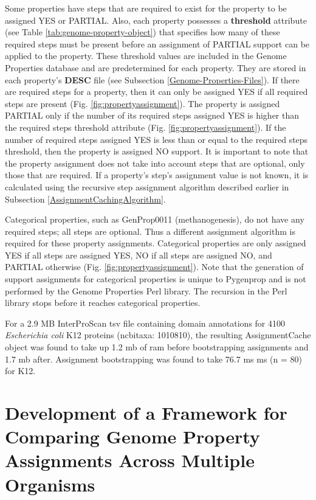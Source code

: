 Some properties have steps that are required to exist for the property to be 
assigned YES or PARTIAL. Also, each property possesses a \textbf{threshold} 
attribute (see Table \ref{tab:genome-property-object}) that specifies how many 
of these required steps must be present before an assignment of PARTIAL support 
can be applied to the property. These threshold values are included in the 
Genome Properties database and are predetermined for each property. They are 
stored in each property's \textbf{DESC} file (see Subsection 
\ref{Genome-Properties-Files}). If there are required steps for a property, then 
it can only be assigned YES if all required steps are present (Fig. 
\ref{fig:propertyassignment}). The property is assigned PARTIAL only if the 
number of its required steps assigned YES is higher than the required steps 
threshold attribute (Fig. \ref{fig:propertyassignment}). If the number of 
required steps assigned YES is less than or equal to the required steps 
threshold, then the property is assigned NO support. It is important to note 
that the property assignment does not take into account steps that are optional, 
only those that are required. If a property's step's assignment value is not 
known, it is calculated using the recursive step assignment algorithm described 
earlier in Subsection \ref{AssignmentCachingAlgorithm}.

Categorical properties, such as GenProp0011 (methanogenesis), do not have any 
required steps; all steps are optional. Thus a different assignment algorithm is 
required for these property assignments. Categorical properties are only 
assigned YES if all steps are assigned YES, NO if all steps are assigned NO, and 
PARTIAL otherwise (Fig. \ref{fig:propertyassignment}). Note that the generation 
of support assignments for categorical properties is unique to Pygenprop and is 
not performed by the Genome Properties Perl library. The recursion in the Perl 
library stops before it reaches categorical properties.

For a 2.9 MB InterProScan \gls{tsv} file containing domain annotations for 4100 
\textit{Escherichia coli} K12 proteins (\gls{ncbitaxa}: 1010810), the resulting 
AssignmentCache object was found to take up 1.2 \gls{mb} of \gls{ram} before 
bootstrapping assignments and 1.7 \gls{mb} after. Assignment bootstrapping was 
found to take 76.7 ms  ms (\gls{n} = 80) for K12.

\section{Development of a Framework for Comparing Genome Property Assignments 
Across Multiple Organisms} \label{GenomePropertiesResults}

